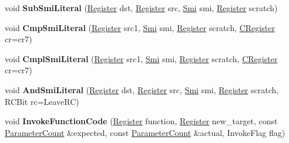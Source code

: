 \begin{DoxyCompactItemize}
\item 
\mbox{\label{classv8_1_1internal_1_1MacroAssembler_ac53c03754ecf559ca1dc652bb22aa740}} 
void {\bfseries Sub\+Smi\+Literal} (\mbox{\hyperlink{classv8_1_1internal_1_1Register}{Register}} dst, \mbox{\hyperlink{classv8_1_1internal_1_1Register}{Register}} src, \mbox{\hyperlink{classv8_1_1internal_1_1Smi}{Smi}} smi, \mbox{\hyperlink{classv8_1_1internal_1_1Register}{Register}} scratch)
\item 
\mbox{\label{classv8_1_1internal_1_1MacroAssembler_a2fec7e79707a4b5574c92d636449faf8}} 
void {\bfseries Cmp\+Smi\+Literal} (\mbox{\hyperlink{classv8_1_1internal_1_1Register}{Register}} src1, \mbox{\hyperlink{classv8_1_1internal_1_1Smi}{Smi}} smi, \mbox{\hyperlink{classv8_1_1internal_1_1Register}{Register}} scratch, \mbox{\hyperlink{classv8_1_1internal_1_1CRegister}{C\+Register}} cr=cr7)
\item 
\mbox{\label{classv8_1_1internal_1_1MacroAssembler_a5a01a0240186a2cb721a96547640f4cd}} 
void {\bfseries Cmpl\+Smi\+Literal} (\mbox{\hyperlink{classv8_1_1internal_1_1Register}{Register}} src1, \mbox{\hyperlink{classv8_1_1internal_1_1Smi}{Smi}} smi, \mbox{\hyperlink{classv8_1_1internal_1_1Register}{Register}} scratch, \mbox{\hyperlink{classv8_1_1internal_1_1CRegister}{C\+Register}} cr=cr7)
\item 
\mbox{\label{classv8_1_1internal_1_1MacroAssembler_af04c9b6b755b873788c8bbf54a395554}} 
void {\bfseries And\+Smi\+Literal} (\mbox{\hyperlink{classv8_1_1internal_1_1Register}{Register}} dst, \mbox{\hyperlink{classv8_1_1internal_1_1Register}{Register}} src, \mbox{\hyperlink{classv8_1_1internal_1_1Smi}{Smi}} smi, \mbox{\hyperlink{classv8_1_1internal_1_1Register}{Register}} scratch, R\+C\+Bit rc=Leave\+RC)
\item 
\mbox{\label{classv8_1_1internal_1_1MacroAssembler_a45a3612fb3be7000eb94309ac385674b}} 
void {\bfseries Invoke\+Function\+Code} (\mbox{\hyperlink{classv8_1_1internal_1_1Register}{Register}} function, \mbox{\hyperlink{classv8_1_1internal_1_1Register}{Register}} new\+\_\+target, const \mbox{\hyperlink{classv8_1_1internal_1_1ParameterCount}{Parameter\+Count}} \&expected, const \mbox{\hyperlink{classv8_1_1internal_1_1ParameterCount}{Parameter\+Count}} \&actual, Invoke\+Flag flag)

\end{DoxyCompactItemize}
